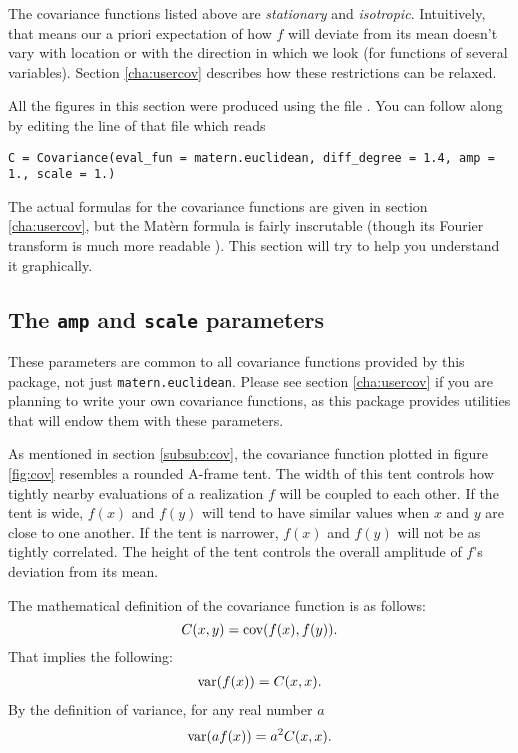 The covariance functions listed above are \emph{stationary} and \emph{isotropic}. Intuitively, that means our a priori expectation of how $f$ will deviate from its mean doesn't vary with location or with the direction in which we look (for functions of several variables). Section \ref{cha:usercov} describes how these restrictions can be relaxed.

All the figures in this section were produced using the file . You can follow along by editing the line of that file which reads
\begin{verbatim}
C = Covariance(eval_fun = matern.euclidean, diff_degree = 1.4, amp = 1., scale = 1.)
\end{verbatim}

The actual formulas for the covariance functions are given in section \ref{cha:usercov}, but the Mat\`ern formula is fairly inscrutable (though its Fourier transform is much more readable \cite{stein}). This section will try to help you understand it graphically.

\subsection*{The \texttt{amp} and \texttt{scale} parameters}\label{sub:ampscale}

These parameters are common to all covariance functions provided by this package, not just \texttt{matern.euclidean}. Please see section \ref{cha:usercov} if you are planning to write your own covariance functions, as this package provides utilities that will endow them with these parameters.

As mentioned in section \ref{subsub:cov}, the covariance function plotted in figure \ref{fig:cov} resembles a rounded A-frame tent. The width of this tent controls how tightly nearby evaluations of a realization $f$ will be coupled to each other. If the tent is wide, $f(x)$ and $f(y)$ will tend to have similar values when $x$ and $y$ are close to one another. If the tent is narrower, $f(x)$ and $f(y)$ will not be as tightly correlated. The height of the tent controls the overall amplitude of $f$'s deviation from its mean.

The mathematical definition of the covariance function is as follows:
\begin{equation}
    \label{covdef}
    C(x,y)=\textup{cov}(f(x), f(y)).
\end{equation}
That implies the following:
\begin{eqnarray*}
    \textup{var}(f(x))=C(x,x).
\end{eqnarray*}
By the definition of variance, for any real number $a$
\begin{eqnarray*}
    \textup{var}( a f(x))=a^2 C(x,x).
\end{eqnarray*}

